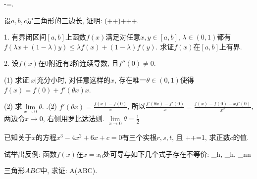 \bee
{}-=.
\eee
\eu

\bu{}{}
设$a,b,c$是三角形的三边长, 证明:
\left(++\right)+++.
\eee
\eu

1. 有界闭区间$[a,b]$上函数$f(x)$满足对任意$x,y\in [a,b]$, $\lambda\in(0,1)$都有$f(\lambda x+(1-\lambda)y)\le\lambda f(x)+(1-\lambda)f(y)$. 求证$f(x)$在$[a,b]$上有界.

2. 设$f(x)$在$0$附近有$2$阶连续导数, 且$f''(0)\ne0$. 

(1) 求证$|x|$充分小时, 对任意这样的$x$, 存在唯一$\theta\in(0,1)$使得$f(x)=f(0)+f'(\theta x)x$.

(2) 求$\lim\limits_{x\to 0}\theta$.
\eu
{}.(2) $f'(\theta x)=\frac{f(x)-f(0)}{x}$, 所以$\frac{f'(\theta x)-f'(0)}{x}=\frac{f(x)-f(0)-xf'(0)}{x^2}$, 两边令$x\to0$, 右侧用罗比达法则. $\lim\limits_{x\to 0}\theta=\frac12$
\ea

已知关于$x$的方程$x^3-4x^2+6x+c=0$有三个实根$r, s, t$, 且
\bee
{}++=1,
\eee
求正数$c$的值.
\eu

试举出反例: 函数$f(x)$在$x=x_0$处可导与如下几个式子存在不等价:
\bee
\lim_{h},\quad
\lim_{h},\quad
\lim_{n\to\infty}n
\eee
\eu

三角形$ABC$中, 求证: 
\bee
\prodcyc\cos A\le{}\cot{}\tan(ABC)\le\prodcyc\sin{}.
\eee
\eu
